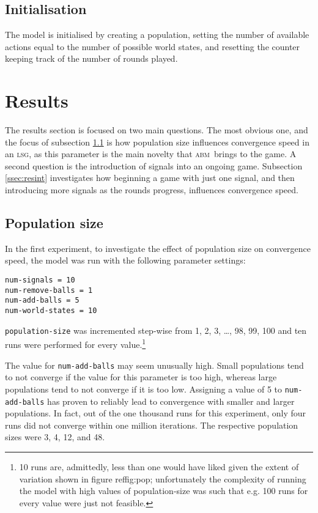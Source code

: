 \documentclass[
	DIV=calc,
	BCOR=0mm,
	pagesize,
]{scrartcl}
\newcommand{\code}[1]{\texttt{#1}}
\newcommand{\abm}{\textsc{abm}}
\newcommand{\lsg}{\textsc{lsg}}
\begin{document}
\subsection{Initialisation}
\label{ssec:modini}
The model is initialised by creating a population, setting the number of available actions equal to the number of possible world states, and resetting the counter keeping track of the number of rounds played.

\section{Results}
\label{sec:res}
The results section is focused on two main questions.
The most obvious one, and the focus of subsection \ref{ssec:respop} is how population size influences convergence speed in an \lsg, as this parameter is the main novelty that \abm\ brings to the game.
A second question is the introduction of signals into an ongoing game.
Subsection \ref{ssec:resint} investigates how beginning a game with just one signal, and then introducing more signals as the rounds progress, influences convergence speed.

\subsection{Population size}
\label{ssec:respop}
In the first experiment, to investigate the effect of population size on convergence speed, the model was run with the following parameter settings:
\begin{verbatim}
num-signals = 10
num-remove-balls = 1
num-add-balls = 5
num-world-states = 10
\end{verbatim}
\code{population-size} was incremented step-wise from 1, 2, 3, \ldots, 98, 99, 100 and ten runs were performed for every value.\footnote{10 runs are, admittedly, less than one would have liked given the extent of variation shown in figure ref{fig:pop}; unfortunately the complexity of running the model with high values of population-size was such that e.g. 100 runs for every value were just not feasible.}

The value for \code{num-add-balls} may seem unusually high.
Small populations tend to not converge if the value for this parameter is too high, whereas large populations tend to not converge if it is too low.
Assigning a value of 5 to \code{num-add-balls} has proven to reliably lead to convergence with smaller and larger populations.
In fact, out of the one thousand runs for this experiment, only four runs did not converge within one million iterations.
The respective population sizes were 3, 4, 12, and 48.
\end{document}
